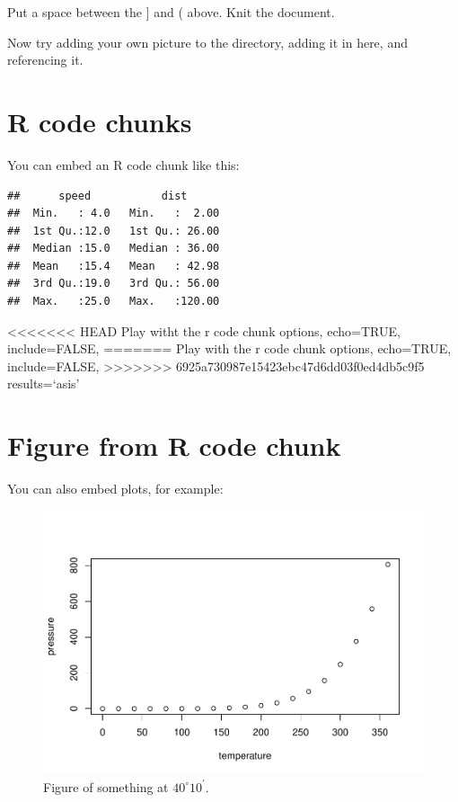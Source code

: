 \documentclass[12pt,]{article}
\begin{document}
Put a space between the {]} and ( above. Knit the document.

Now try adding your own picture to the directory, adding it in here, and
referencing it.

\section{R code chunks}\label{r-code-chunks}

You can embed an R code chunk like this:

\begin{verbatim}
##      speed           dist       
##  Min.   : 4.0   Min.   :  2.00  
##  1st Qu.:12.0   1st Qu.: 26.00  
##  Median :15.0   Median : 36.00  
##  Mean   :15.4   Mean   : 42.98  
##  3rd Qu.:19.0   3rd Qu.: 56.00  
##  Max.   :25.0   Max.   :120.00
\end{verbatim}

<<<<<<< HEAD
Play witht the r code chunk options, echo=TRUE, include=FALSE,
=======
Play with the r code chunk options, echo=TRUE, include=FALSE,
>>>>>>> 6925a730987e15423ebc47d6dd03f0ed4db5c9f5
results=`asis'

\FloatBarrier

\section{Figure from R code chunk}\label{figure-from-r-code-chunk}

You can also embed plots, for example:

\begin{figure}[htbp]
\centering
\includegraphics{4-Workshop_examples_files/figure-latex/pressure-1.pdf}
\caption{Figure of something at \(40^\circ 10^\prime\).
\label{fig:pressure}}
\end{figure}
\end{document}
